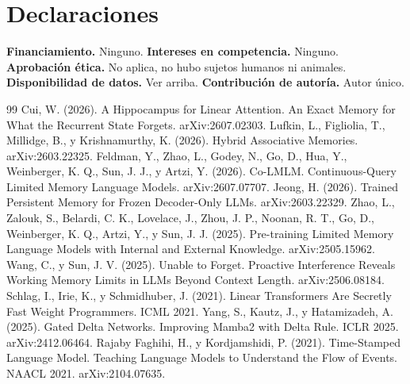\documentclass[11pt,a4paper]{article}
\begin{document}
\section*{Declaraciones}

\textbf{Financiamiento.} Ninguno. \textbf{Intereses en competencia.} Ninguno. \textbf{Aprobación
ética.} No aplica, no hubo sujetos humanos ni animales. \textbf{Disponibilidad de datos.} Ver arriba.
\textbf{Contribución de autoría.} Autor único.

\begin{thebibliography}{99}
 Cui, W. (2026). A Hippocampus for Linear Attention. An Exact Memory for What the Recurrent State Forgets. arXiv:2607.02303.
 Lufkin, L., Figliolia, T., Millidge, B., y Krishnamurthy, K. (2026). Hybrid Associative Memories. arXiv:2603.22325.
 Feldman, Y., Zhao, L., Godey, N., Go, D., Hua, Y., Weinberger, K. Q., Sun, J. J., y Artzi, Y. (2026). Co-LMLM. Continuous-Query Limited Memory Language Models. arXiv:2607.07707.
 Jeong, H. (2026). Trained Persistent Memory for Frozen Decoder-Only LLMs. arXiv:2603.22329.
 Zhao, L., Zalouk, S., Belardi, C. K., Lovelace, J., Zhou, J. P., Noonan, R. T., Go, D., Weinberger, K. Q., Artzi, Y., y Sun, J. J. (2025). Pre-training Limited Memory Language Models with Internal and External Knowledge. arXiv:2505.15962.
 Wang, C., y Sun, J. V. (2025). Unable to Forget. Proactive Interference Reveals Working Memory Limits in LLMs Beyond Context Length. arXiv:2506.08184.
 Schlag, I., Irie, K., y Schmidhuber, J. (2021). Linear Transformers Are Secretly Fast Weight Programmers. ICML 2021.
 Yang, S., Kautz, J., y Hatamizadeh, A. (2025). Gated Delta Networks. Improving Mamba2 with Delta Rule. ICLR 2025. arXiv:2412.06464.
 Rajaby Faghihi, H., y Kordjamshidi, P. (2021). Time-Stamped Language Model. Teaching Language Models to Understand the Flow of Events. NAACL 2021. arXiv:2104.07635.
\end{thebibliography}
\end{document}
